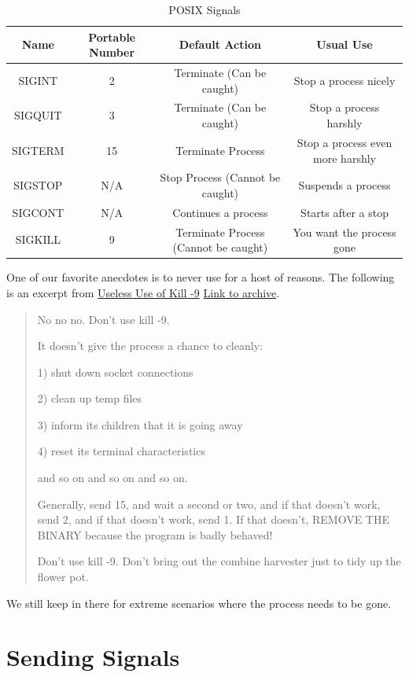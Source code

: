 \begin{center}
\begin{table}[h]
\caption{POSIX Signals}
\begin{tabular}{|c|c|c|c|}
Name & Portable Number & Default Action & Usual Use \\ \hline
SIGINT & 2 & Terminate (Can be caught) & Stop a process nicely \\
SIGQUIT & 3 & Terminate (Can be caught) & Stop a process harshly \\
SIGTERM & 15 & Terminate Process & Stop a process even more harshly \\
SIGSTOP & N/A & Stop Process (Cannot be caught) & Suspends a process \\
SIGCONT & N/A & Continues a process & Starts after a stop \\
SIGKILL & 9 & Terminate Process (Cannot be caught) & You want the process gone
\end{tabular}
\end{table}
\end{center}

One of our favorite anecdotes is to never use  for a host of reasons.
The following is an excerpt from \underline{Useless Use of Kill -9} \href{http://porkmail.org/era/unix/award.html}{Link to archive}.

\begin{quote}
No no no.  Don't use kill -9.

It doesn't give the process a chance to cleanly:

1) shut down socket connections

2) clean up temp files

3) inform its children that it is going away

4) reset its terminal characteristics

and so on and so on and so on.

Generally, send 15, and wait a second or two, and if that doesn't
work, send 2, and if that doesn't work, send 1.  If that doesn't,
REMOVE THE BINARY because the program is badly behaved!

Don't use kill -9.  Don't bring out the combine harvester just to tidy
up the flower pot.
\end{quote}

We still keep  in there for extreme scenarios where the process needs to be gone.

\section{Sending Signals}

